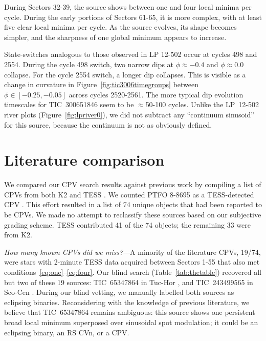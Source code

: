 \documentclass[11pt,twocolumn,tighten]{aastex63}
\begin{document}
During Sectors 32-39, the source shows between one and four local
minima per cycle.  During the early portions of Sectors 61-65, it is
more complex, with at least five clear local minima per
cycle.  As the source evolves, its shape becomes simpler, and the
sharpness of one global minimum appears to increase.

State-switches analogous to those observed in LP 12-502 occur at
cycles 498 and 2554.  During the cycle 498 switch, two narrow dips at
$\phi$$\approx$$-0.4$ and $\phi$$\approx$0.0 collapse.  For the cycle
2554 switch, a longer dip collapses.  This is visible as a change in
curvature in Figure~\ref{fig:tic3006timegroups} between $\phi \in
[-0.25, -0.05]$ across cycles 2520-2561.  The  more typical dip
evolution timescales for TIC~300651846 seem to be $\approx$50-100
cycles.  Unlike the LP~12-502 river plots
(Figure~\ref{fig:lpriver0}), we did not subtract any ``continuum
sinusoid'' for this source, because the continuum is not as obviously
defined.


\section{Literature comparison}
\label{sec:litcomp}

We compared our CPV search results against previous work by
compiling a list of CPVs from both K2
\citep{2017AJ....153..152S,2018AJ....155...63S} and TESS
\citep{2019ApJ...876..127Z,2020AJ....160...86B,2021AJ....161...60S,2022AJ....163..144G,2023ApJ...945..114P}.
We counted PTFO 8-8695 as a TESS-detected CPV \citep[but see][and
references therein]{2020AJ....160...86B}.  This effort resulted in a
list of 74 unique objects that had been reported to be CPVs.  We made
no attempt to reclassify these sources based on our subjective grading
scheme.  TESS contributed 41 of the 74 objects; the remaining 33 were
from K2.  

{\it How many known CPVs did we miss?}---A minority of the literature
CPVs, 19/74, were stars with 2-minute TESS data acquired between
Sectors 1-55 that also met conditions~\ref{eq:one}--\ref{eq:four}.
Our blind search (Table~\ref{tab:thetable}) recovered all but two of
these 19 sources: TIC~65347864 in Tuc-Hor \citep{2023ApJ...945..114P},
and TIC~243499565 in Sco-Cen \citep{2021AJ....161...60S}.  During our
blind vetting, we manually labelled both sources as eclipsing
binaries.  Reconsidering with the knowledge of previous literature, we
believe that TIC~65347864 remains ambiguous: this source shows one
persistent broad local minimum superposed over sinusoidal spot
modulation; it could be an eclipsing binary, an RS CVn, or a CPV.
\end{document}
